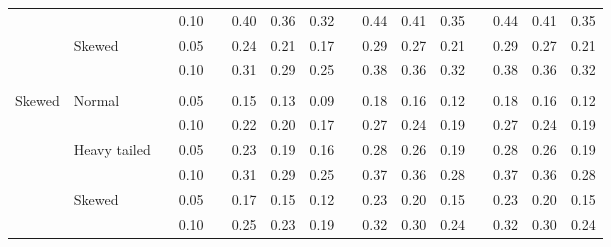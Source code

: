 \documentclass{article} %
\begin{document}
\begin{table}[ht]
\begin{scriptsize}
\begin{center}
\begin{tabular}{ll p{.1cm} c p{.1cm} rrr p{.1cm} rrr p{.1cm} rrr}
             &              && 0.10 &&   0.40 & 0.36 & 0.32 && 0.44 & 0.41 & 0.35 && 0.44 & 0.41 & 0.35 \\ 
             & Skewed       && 0.05 &&   0.24 & 0.21 & 0.17 && 0.29 & 0.27 & 0.21 && 0.29 & 0.27 & 0.21 \\ 
             &              && 0.10 &&   0.31 & 0.29 & 0.25 && 0.38 & 0.36 & 0.32 && 0.38 & 0.36 & 0.32 \\ 
             &&&&&&&&&&&&&&&\\
Skewed       & Normal       && 0.05 &&   0.15 & 0.13 & 0.09 && 0.18 & 0.16 & 0.12 && 0.18 & 0.16 & 0.12 \\ 
             &              && 0.10 &&   0.22 & 0.20 & 0.17 && 0.27 & 0.24 & 0.19 && 0.27 & 0.24 & 0.19 \\ 
             & Heavy tailed && 0.05 &&   0.23 & 0.19 & 0.16 && 0.28 & 0.26 & 0.19 && 0.28 & 0.26 & 0.19 \\ 
             &              && 0.10 &&   0.31 & 0.29 & 0.25 && 0.37 & 0.36 & 0.28 && 0.37 & 0.36 & 0.28 \\ 
             & Skewed       && 0.05 &&   0.17 & 0.15 & 0.12 && 0.23 & 0.20 & 0.15 && 0.23 & 0.20 & 0.15 \\ 
             &              && 0.10 &&   0.25 & 0.23 & 0.19 && 0.32 & 0.30 & 0.24 && 0.32 & 0.30 & 0.24 \\ 


\end{tabular}
\end{center}
\end{scriptsize}
\end{table}
\end{document}
